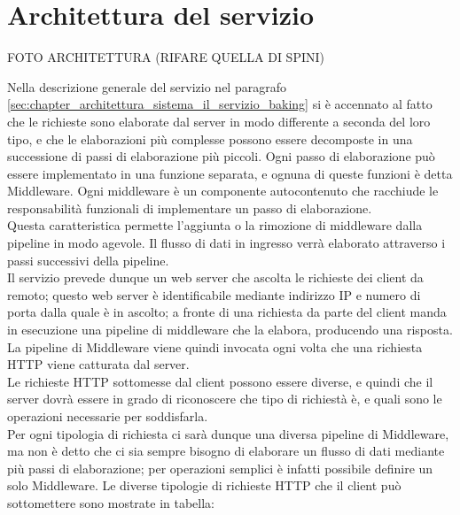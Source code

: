 \section{Architettura del servizio}
\label{sec:chapter_baking_service_architettura_servizio}

FOTO ARCHITETTURA (RIFARE QUELLA DI SPINI)

Nella descrizione generale del servizio nel paragrafo \ref{sec:chapter_architettura_sistema_il_servizio_baking} si è accennato al fatto che le richieste sono elaborate dal server in modo differente a seconda del loro tipo, e che le elaborazioni più complesse possono essere decomposte in una successione di passi di elaborazione più piccoli. Ogni passo di elaborazione può essere implementato in una funzione separata, e ognuna di queste funzioni è detta Middleware. Ogni middleware è un componente autocontenuto che racchiude le responsabilità funzionali di implementare un passo di elaborazione.
\\
Questa caratteristica permette l’aggiunta o la rimozione di middleware dalla pipeline in modo agevole. Il flusso di dati in ingresso verrà elaborato attraverso i passi successivi della pipeline. 
\\
Il servizio prevede dunque un web server che ascolta le richieste dei client da remoto; questo web server è identificabile mediante indirizzo IP e numero di porta dalla quale è in ascolto; a fronte di una richiesta da parte del client manda in esecuzione una pipeline di middleware che la elabora, producendo una risposta. La pipeline di Middleware viene quindi invocata ogni volta che una richiesta HTTP viene catturata dal server. 
\\
Le richieste HTTP sottomesse dal client possono essere diverse, e quindi che il server dovrà essere in grado di riconoscere che tipo di richiestà è, e quali sono le operazioni necessarie per soddisfarla. 
\\
Per ogni tipologia di richiesta ci sarà dunque una diversa pipeline di Middleware, ma non è detto che ci sia sempre bisogno di elaborare un flusso di dati mediante più passi di elaborazione; per operazioni semplici è infatti possibile definire un solo Middleware. 
Le diverse tipologie di richieste HTTP che il client può sottomettere sono mostrate in tabella:
